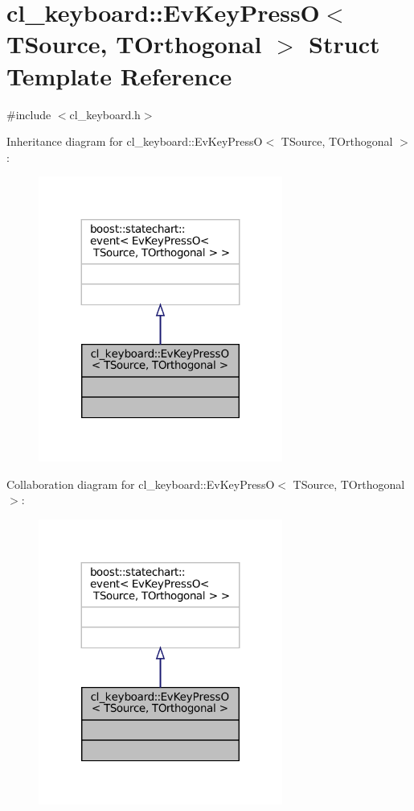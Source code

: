 \hypertarget{structcl__keyboard_1_1EvKeyPressO}{}\section{cl\+\_\+keyboard\+:\+:Ev\+Key\+PressO$<$ T\+Source, T\+Orthogonal $>$ Struct Template Reference}
\label{structcl__keyboard_1_1EvKeyPressO}


{\ttfamily \#include $<$cl\+\_\+keyboard.\+h$>$}



Inheritance diagram for cl\+\_\+keyboard\+:\+:Ev\+Key\+PressO$<$ T\+Source, T\+Orthogonal $>$\+:
\nopagebreak
\begin{figure}[H]
\begin{center}
\leavevmode
\includegraphics[width=227pt]{structcl__keyboard_1_1EvKeyPressO__inherit__graph}
\end{center}
\end{figure}


Collaboration diagram for cl\+\_\+keyboard\+:\+:Ev\+Key\+PressO$<$ T\+Source, T\+Orthogonal $>$\+:
\nopagebreak
\begin{figure}[H]
\begin{center}
\leavevmode
\includegraphics[width=227pt]{structcl__keyboard_1_1EvKeyPressO__coll__graph}
\end{center}
\end{figure}


